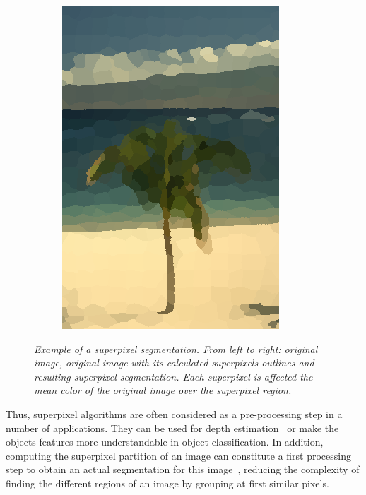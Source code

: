 \documentclass{article}
\begin{document}
\begin{figure}[!ht]
\begin{subfigure}{.3\linewidth}
            \includegraphics[width=0.9\linewidth]{pics/img_spp3.png}
        \end{subfigure}
            \caption{\textit{Example of a superpixel segmentation. From left to right: original image, original image with its calculated superpixels outlines and resulting superpixel segmentation. Each superpixel is affected the mean color of the original image over the superpixel region.}}
            \label{fig:spp}
        \end{figure}
        \par
        Thus, superpixel algorithms are often considered as a pre-processing step in a number of applications. They can be used for depth estimation~\cite{zitnick2007} or make the objects features more understandable in object classification. In addition, computing the superpixel partition of an image can constitute a first processing step to obtain an actual segmentation for this image~\cite{fulkerson2009}, reducing the complexity of finding the different regions of an image by grouping at first similar pixels.
\end{document}
